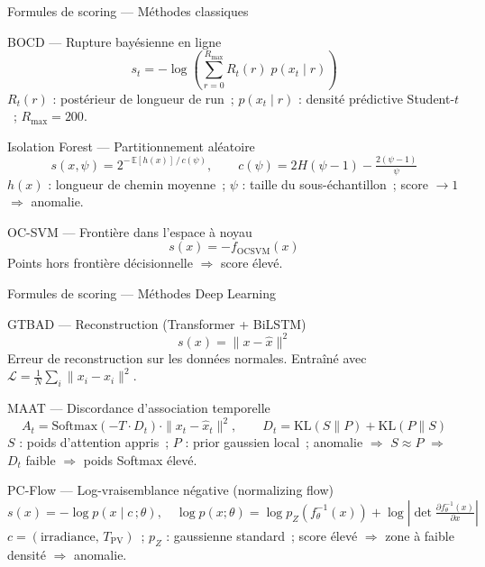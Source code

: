 \documentclass[10pt,aspectratio=169]{beamer}
\begin{document}

\begin{frame}{Formules de scoring — Méthodes classiques}
  \footnotesize
  \begin{block}{BOCD — Rupture bayésienne en ligne}
    \[
      s_t = -\log\!\left(\sum_{r=0}^{R_{\max}} R_t(r)\; p(x_t \mid r)\right)
    \]
    $R_t(r)$ : postérieur de longueur de run~; $p(x_t\mid r)$ : densité prédictive Student-$t$~; $R_{\max}=200$.
  \end{block}

  \vspace{0.4em}
  \begin{block}{Isolation Forest — Partitionnement aléatoire}
    \[
      s(x,\psi) = 2^{-\,\mathbb{E}[h(x)]\,/\,c(\psi)},
      \qquad c(\psi) = 2H(\psi-1) - \tfrac{2(\psi-1)}{\psi}
    \]
    $h(x)$ : longueur de chemin moyenne~; $\psi$ : taille du sous-échantillon~; score $\to 1$ $\Rightarrow$ anomalie.
  \end{block}

  \vspace{0.4em}
  \begin{block}{OC-SVM — Frontière dans l'espace à noyau}
    \[
      s(x) = -f_{\mathrm{OCSVM}}(x)
    \]
    Points hors frontière décisionnelle $\Rightarrow$ score élevé.
  \end{block}
\end{frame}

\begin{frame}{Formules de scoring — Méthodes Deep Learning}
  \footnotesize
  \begin{block}{GTBAD — Reconstruction (Transformer + BiLSTM)}
    \[
      s(x) = \|x - \hat{x}\|^2
    \]
    Erreur de reconstruction sur les données normales. Entraîné avec $\mathcal{L} = \frac{1}{N}\sum_i \|x_i - \hat{x}_i\|^2$.
  \end{block}

  \vspace{0.3em}
  \begin{block}{MAAT — Discordance d'association temporelle}
    \[
      A_t = \mathrm{Softmax}(-T \cdot D_t)\cdot\|x_t - \hat{x}_t\|^2,
      \qquad D_t = \mathrm{KL}(S\|P) + \mathrm{KL}(P\|S)
    \]
    $S$ : poids d'attention appris~; $P$ : prior gaussien local~; anomalie $\Rightarrow$ $S \approx P$ $\Rightarrow$ $D_t$ faible $\Rightarrow$ poids Softmax élevé.
  \end{block}

  \vspace{0.3em}
  \begin{block}{PC-Flow — Log-vraisemblance négative (normalizing flow)}
    \[
      s(x) = -\log p(x \mid c\,;\theta),
      \quad
      \log p(x;\theta) = \log p_Z\!\left(f_\theta^{-1}(x)\right)
        + \log\!\left|\det\!\tfrac{\partial f_\theta^{-1}(x)}{\partial x}\right|
    \]
    $c = (\text{irradiance},\, T_{\mathrm{PV}})$~; $p_Z$ : gaussienne standard~; score élevé $\Rightarrow$ zone à faible densité $\Rightarrow$ anomalie.
  \end{block}
\end{frame}
\end{document}
